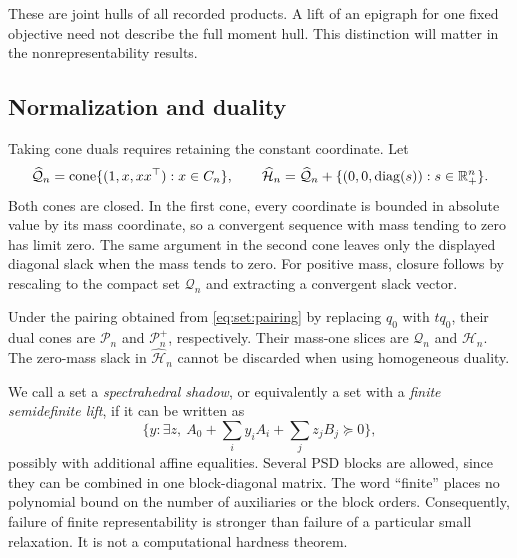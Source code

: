 These are joint hulls of all recorded products. A lift of an epigraph for
one fixed objective need not describe the full moment hull. This distinction
will matter in the nonrepresentability results.

\subsection{Normalization and duality}\label{set:dual}
Taking cone duals requires retaining the constant coordinate. Let
\[
 \widehat{\mathcal Q}_n
   =\operatorname{cone}\{(1,x,xx^\top):x\in C_n\},\qquad
 \widehat{\mathcal H}_n
   =\widehat{\mathcal Q}_n+
       \{(0,0,\operatorname{diag}(s)):s\in\mathbb R_+^n\}.
\]
Both cones are closed. In the first cone, every coordinate is bounded in
absolute value by its mass coordinate, so a convergent sequence with mass
tending to zero has limit zero. The same argument in the second cone leaves
only the displayed diagonal slack when the mass tends to zero. For positive
mass, closure follows by rescaling to the compact set $\mathcal Q_n$ and
extracting a convergent slack vector.

Under the pairing obtained from \eqref{eq:set:pairing} by replacing $q_0$
with $tq_0$, their dual cones are $\mathcal P_n$ and $\mathcal P_n^+$,
respectively. Their mass-one slices are $\mathcal Q_n$ and $\mathcal H_n$.
The zero-mass slack in $\widehat{\mathcal H}_n$ cannot be discarded when
using homogeneous duality.

We call a set a \emph{spectrahedral shadow}, or equivalently a set with a
\emph{finite semidefinite lift}, if it can be written as
\begin{equation}\label{eq:set:shadow}
 \{y:\exists z,\ A_0+\textstyle\sum_i y_iA_i+\sum_j z_jB_j\succeq0\},
\end{equation}
possibly with additional affine equalities. Several PSD blocks are allowed,
since they can be combined in one block-diagonal matrix. The word ``finite''
places no polynomial bound on the number of auxiliaries or the block orders.
Consequently, failure of finite representability is stronger than failure
of a particular small relaxation. It is not a computational hardness theorem.

